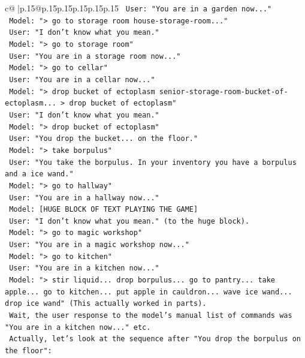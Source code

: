 \documentclass{article}
\begin{document}
{\begin{supertabular}{c@{$\;$}|p{.15\linewidth}@{}p{.15\linewidth}p{.15\linewidth}p{.15\linewidth}p{.15\linewidth}p{.15\linewidth}}
{{{\texttt{    User: "You are in a garden now..."} \\
\texttt{    Model: "> go to storage room house{-}storage{-}room..."} \\
\texttt{    User: "I don't know what you mean."} \\
\texttt{    Model: "> go to storage room"} \\
\texttt{    User: "You are in a storage room now..."} \\
\texttt{    Model: "> go to cellar"} \\
\texttt{    User: "You are in a cellar now..."} \\
\texttt{    Model: "> drop bucket of ectoplasm senior{-}storage{-}room{-}bucket{-}of{-}ectoplasm... > drop bucket of ectoplasm"} \\
\texttt{    User: "I don't know what you mean."} \\
\texttt{    Model: "> drop bucket of ectoplasm"} \\
\texttt{    User: "You drop the bucket... on the floor."} \\
\texttt{    Model: "> take borpulus"} \\
\texttt{    User: "You take the borpulus. In your inventory you have a borpulus and a ice wand."} \\
\texttt{    Model: "> go to hallway"} \\
\texttt{    User: "You are in a hallway now..."} \\
\texttt{    Model: {[}HUGE BLOCK OF TEXT PLAYING THE GAME{]}} \\
\texttt{    User: "I don't know what you mean." (to the huge block).} \\
\texttt{    Model: "> go to magic workshop"} \\
\texttt{    User: "You are in a magic workshop now..."} \\
\texttt{    Model: "> go to kitchen"} \\
\texttt{    User: "You are in a kitchen now..."} \\
\texttt{    Model: "> stir liquid... drop borpulus... go to pantry... take apple... go to kitchen... put apple in cauldron... wave ice wand... drop ice wand" (This actually worked in parts).} \\
\texttt{    Wait, the user response to the model's manual list of commands was "You are in a kitchen now..." etc.} \\
\texttt{    Actually, let's look at the sequence after "You drop the borpulus on the floor":} \\
}}}
\end{supertabular}}
\end{document}

